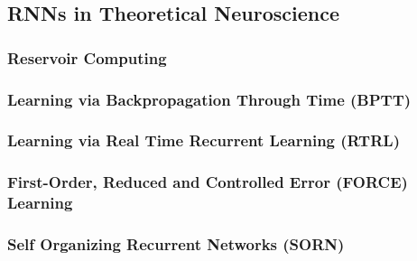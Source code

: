\documentclass[main]{subfiles}
\begin{document}
\subsection{RNNs in Theoretical Neuroscience}
\subsubsection{Reservoir Computing}
\subsubsection{Learning via Backpropagation Through Time (BPTT)}
\subsubsection{Learning via Real Time Recurrent Learning (RTRL)}
\subsubsection{First-Order, Reduced and Controlled Error (FORCE) Learning}
\subsubsection{Self Organizing Recurrent Networks (SORN)}
\end{document}
